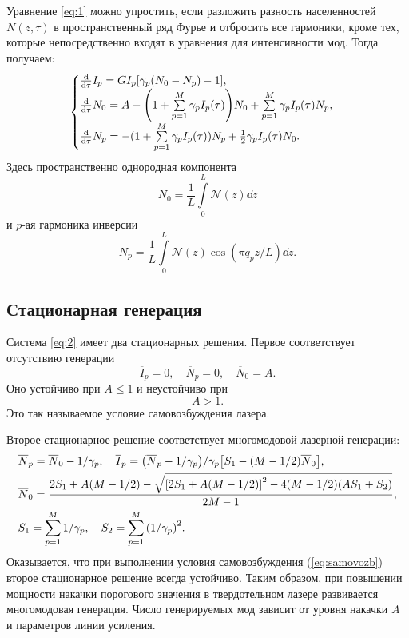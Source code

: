 \documentclass[12pt]{article}
\begin{document}
	Уравнение \ref{eq:1} можно упростить, если разложить разность населенностей $N(z,\tau)$ в пространственный ряд Фурье и отбросить все гармоники, кроме тех, которые непосредственно входят в уравнения для интенсивности мод. Тогда получаем:
	\begin{equation}\label{eq:2}
		\begin{cases}
			\dv{\tau} I_p = G I_p \qty[\gamma_p \qty(N_0 - N_p) - 1],\\
			\dv{\tau} N_0 = A - \qty(1 + \sum\limits_{p=1}^{M} \gamma_p I_p(\tau))N_0 + \sum\limits_{p=1}^{M} \gamma_p I_p(\tau) N_p,\\
			\dv{\tau} N_p = - (1 + \sum\limits_{p=1}^{M} \gamma_p I_p(\tau))N_p + \frac12 \gamma_p I_p(\tau) N_0.			
		\end{cases}
	\end{equation}
	Здесь пространственно однородная компонента
	\begin{equation}
		N_0 = \frac1L \int\limits_0^L \mathcal{N}(z) \dd{z}
	\end{equation}
	и $p$-ая гармоника инверсии
	\begin{equation}\label{eq:N_p}
		N_p = \frac1L \int\limits_0^L \mathcal{N}(z) \cos (\pi q_p z/L)\dd{z}.
	\end{equation}

	\subsection{Стационарная генерация}

	Система \ref{eq:2} имеет два стационарных решения. Первое соответствует отсутствию генерации 
	\begin{equation}
		\overline{I}_p = 0,\quad \overline{N}_p = 0,\quad \overline{N}_0 = A.
	\end{equation}
	Оно устойчиво при $A\le1$ и неустойчиво при
	\begin{equation}\label{eq:samovozb}
		A > 1.
	\end{equation}
	Это так называемое условие самовозбуждения лазера.

	Второе стационарное решение соответствует многомодовой лазерной генерации:
	\begin{equation}\label{eq:2nd_stac}
		\begin{split}
			&\overline{N}_p = \overline{N}_0 - 1/\gamma_p,\quad \overline{I}_p =\qty(\overline{N}_p - 1/\gamma_p)/\gamma_p\qty[S_1 - (M-1/2)\overline{N}_0],\\
			&\overline{N}_0 = \dfrac{2S_1 + A\qty(M-1/2) - \sqrt{\qty[2S_1 + A\qty(M-1/2)]^2 - 4\qty(M-1/2)(AS_1 + S_2)}}{2M-1},\\
			&S_1 = \sum\limits_{p=1}^{M} 1/\gamma_p,\quad S_2 = \sum\limits_{p=1}^{M}\qty(1/\gamma_p)^2.
		\end{split}
	\end{equation}
	Оказывается, что при выполнении условия самовозбуждения (\ref{eq:samovozb}) второе стационарное решение всегда устойчиво. Таким образом, при повышении мощности накачки порогового значения в твердотельном лазере развивается многомодовая генерация. Число генерируемых мод зависит от уровня накачки $A$ и параметров линии усиления.
\end{document}
